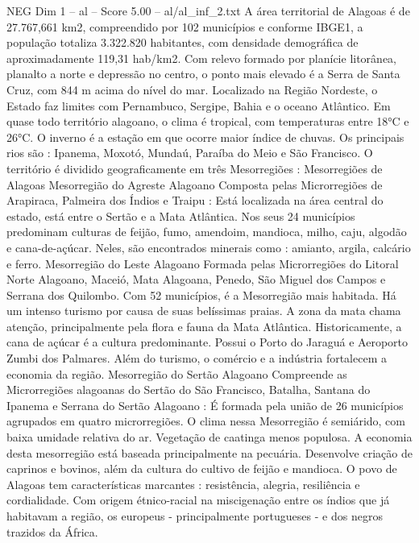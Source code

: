 \begin{textsample}{NEG Dim 1 – al – Score 5.00 – al/al\_inf\_2.txt}  \label{ex:f1_neg_136}
A área territorial de Alagoas é de 27.767,661 km2, compreendido por 102 municípios e conforme IBGE1, a população totaliza 3.322.820 habitantes, com densidade demográfica de aproximadamente 119,31 hab/km2.
Com relevo formado por planície litorânea, planalto a norte e depressão no centro, o ponto mais elevado é a Serra de Santa Cruz, com 844 m acima do nível do mar.
Localizado na Região Nordeste, o Estado faz limites com Pernambuco, Sergipe, Bahia e o oceano Atlântico.
Em quase todo território alagoano, o clima é tropical, com temperaturas entre 18{\EmojiFont °}C e 26{\EmojiFont °}C.
O inverno é a estação em que ocorre maior índice de chuvas.
Os principais rios são : Ipanema, Moxotó, Mundaú, Paraíba do Meio e São Francisco.
O território é dividido geograficamente em três Mesorregiões : Mesorregiões de Alagoas Mesorregião do Agreste Alagoano Composta pelas Microrregiões de Arapiraca, Palmeira dos Índios e Traipu : Está localizada na área central do estado, está entre o Sertão e a Mata Atlântica.
Nos seus 24 municípios predominam culturas de feijão, fumo, amendoim, mandioca, milho, caju, algodão e cana-de-açúcar.
Neles, são encontrados minerais como : amianto, argila, calcário e ferro.
Mesorregião do Leste Alagoano Formada pelas Microrregiões do Litoral Norte Alagoano, Maceió, Mata Alagoana, Penedo, São Miguel dos Campos e Serrana dos Quilombo.
Com 52 municípios, é a Mesorregião mais habitada.
Há um intenso turismo por causa de suas belíssimas praias.
A zona da mata chama atenção, principalmente pela flora e fauna da Mata Atlântica.
Historicamente, a cana de açúcar é a cultura predominante.
Possui o Porto do Jaraguá e Aeroporto Zumbi dos Palmares.
Além do turismo, o comércio e a indústria fortalecem a economia da região.
Mesorregião do Sertão Alagoano Compreende as Microrregiões alagoanas do Sertão do São Francisco, Batalha, Santana do Ipanema e Serrana do Sertão Alagoano : É formada pela união de 26 municípios agrupados em quatro microrregiões.
O clima nessa Mesorregião é semiárido, com baixa umidade relativa do ar.
Vegetação de caatinga menos populosa.
A economia desta mesorregião está baseada principalmente na pecuária.
Desenvolve criação de caprinos e bovinos, além da cultura do cultivo de feijão e mandioca.
O povo de Alagoas tem características marcantes : resistência, alegria, resiliência e cordialidade.
Com origem étnico-racial na miscigenação entre os índios que já habitavam a região, os europeus - principalmente portugueses - e dos negros trazidos da África.

\end{textsample}
